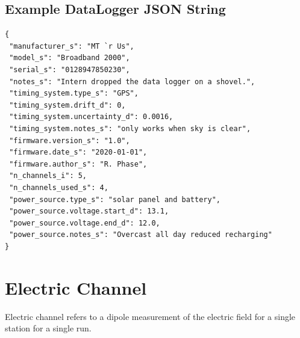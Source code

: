 \documentclass{article}
\begin{document}
\newpage
\subsection{Example DataLogger JSON String}

\begin{verbatim}
{
 "manufacturer_s": "MT `r Us",
 "model_s": "Broadband 2000",
 "serial_s": "0128947850230",
 "notes_s": "Intern dropped the data logger on a shovel.",
 "timing_system.type_s": "GPS",
 "timing_system.drift_d": 0,
 "timing_system.uncertainty_d": 0.0016,
 "timing_system.notes_s": "only works when sky is clear",
 "firmware.version_s": "1.0",
 "firmware.date_s": "2020-01-01",
 "firmware.author_s": "R. Phase",
 "n_channels_i": 5,
 "n_channels_used_s": 4,
 "power_source.type_s": "solar panel and battery",
 "power_source.voltage.start_d": 13.1,
 "power_source.voltage.end_d": 12.0,
 "power_source.notes_s": "Overcast all day reduced recharging"
}
\end{verbatim}

\newpage
\section{Electric Channel}

Electric channel refers to a dipole measurement of the electric field for a single station for a single run.   
 
\end{document}
